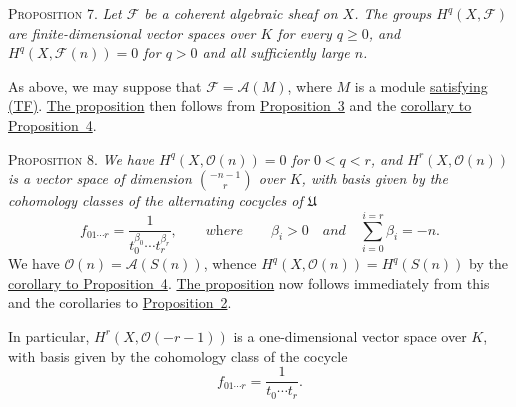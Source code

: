 \label{fac:III:3:no:65:prop:7}
\textsc{Proposition 7.} \textit{Let $\mathcal{F}$ be a coherent algebraic
sheaf on $X$. The groups $H^q(X,\mathcal{F})$ are finite-dimensional
vector spaces over $K$ for every $q\geq0$, and
$H^q(X,\mathcal{F}(n))=0$ for $q>0$ and all sufficiently large $n$.}

As above, we may suppose that $\mathcal{F}=\mathcal{A}(M)$, where $M$ is a
module \hyperref[fac:III:2:no:56:def:TF]{satisfying (TF)}.
\hyperref[fac:III:3:no:65:prop:7]{The proposition} then follows from
\hyperref[fac:III:3:no:63:prop:3]{Proposition~3} and the
\hyperref[fac:III:3:no:64:cor]{corollary to Proposition~4}.

\label{fac:III:3:no:65:prop:8}
\textsc{Proposition 8.} \textit{We have
$H^q(X,\mathcal{O}(n))=0$ for $0<q<r$, and
$H^r(X,\mathcal{O}(n))$ is a vector space of dimension
$\binom{-n-1}{r}$ over $K$, with basis given by the cohomology classes of
the alternating cocycles of $\mathfrak{U}$}
\label{fac:III:3:no:65:formula:top-basis}
\[
f_{01\cdots r}=\frac{1}{t_0^{\beta_0}\cdots t_r^{\beta_r}},
\qquad \textit{where}\qquad
\beta_i>0
\quad\textit{and}\quad
\sum_{i=0}^{i=r}\beta_i=-n.
\]
We have $\mathcal{O}(n)=\mathcal{A}(S(n))$, whence
$H^q(X,\mathcal{O}(n))=H^q(S(n))$ by the
\hyperref[fac:III:3:no:64:cor]{corollary to Proposition~4}.
\hyperref[fac:III:3:no:65:prop:8]{The proposition} now follows immediately
from this and the corollaries to
\hyperref[fac:III:3:no:62:prop:2]{Proposition~2}.

In particular, $H^r(X,\mathcal{O}(-r-1))$ is a one-dimensional vector
space over $K$, with basis given by the cohomology class of the cocycle
\label{fac:III:3:no:65:formula:canonical-top-class}
\[
f_{01\cdots r}=\frac{1}{t_0\cdots t_r}.
\]
